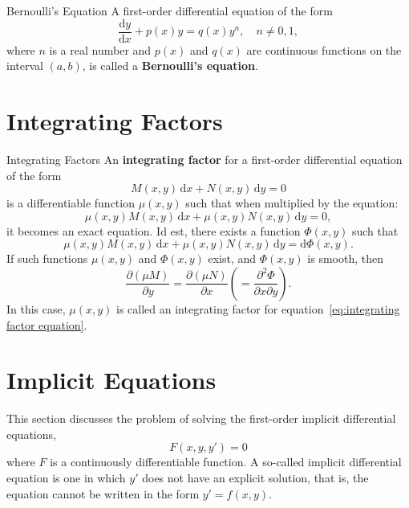 \documentclass[11pt]{elegantbook}
\begin{document}
\begin{definition}{Bernoulli's Equation}
    A first-order differential equation of the form
    \begin{equation*}
        \frac{\mathrm{d}y}{\mathrm{d}x} + p(x) y = q(x) y^n,\quad n \neq 0, 1,
    \end{equation*}
    where \(n\) is a real number and \(p(x)\) and \(q(x)\) are continuous functions on the interval \((a, b)\), 
    is called a \textbf{Bernoulli's equation}.
    
\end{definition}

\section{Integrating Factors}
\begin{definition}{Integrating Factors}
    An \textbf{integrating factor} for a first-order differential equation of the form
    \begin{equation}\label{eq:integrating factor equation}
        M(x, y) \, \mathrm{d}x + N(x, y) \, \mathrm{d}y = 0
    \end{equation}
    is a differentiable function \(\mu(x, y)\) such that when multiplied by the equation:
    \[
    \mu(x, y) M(x, y) \, \mathrm{d}x + \mu(x, y) N(x, y) \, \mathrm{d}y = 0,
    \]
    it becomes an exact equation.
    Id est, there exists a function \(\Phi(x, y)\) such that
    \[
       \mu(x, y) M(x, y) \, \mathrm{d}x + \mu(x, y) N(x, y) \, \mathrm{d}y = \mathrm{d}\Phi(x, y).
    \]
    If such functions \(\mu(x, y)\) and \(\Phi(x, y)\) exist, and \(\Phi(x, y)\) is smooth, then
    \[
    \frac{\partial(\mu M)}{\partial y} = \frac{\partial(\mu N)}{\partial x}\left( = \frac{\partial^2 \Phi}{\partial x \partial y} \right).
    \]
    In this case, \(\mu(x, y)\) is called an integrating factor for equation~\eqref{eq:integrating factor equation}.
\end{definition}


\section{Implicit Equations}
This section discusses the problem of solving the first-order implicit differential equations,
\begin{equation}\label{eq:implicit ODE}
F(x, y, y') = 0
\end{equation}
where \(F\) is a continuously differentiable function. 
A so-called implicit differential equation is one in which \(y'\) does not have an explicit solution, 
that is, the equation cannot be written in the form \(y' = f(x, y)\).
\end{document}
